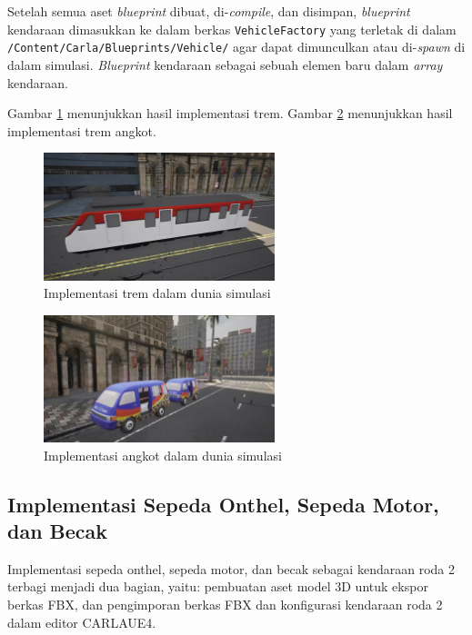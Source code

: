 Setelah semua aset \textit{blueprint} dibuat, di-\textit{compile}, dan disimpan,
\textit{blueprint} kendaraan dimasukkan ke dalam berkas \verb|VehicleFactory|
yang terletak di dalam \verb|/Content/Carla/Blueprints/Vehicle/| agar dapat
dimunculkan atau di-\textit{spawn} di dalam simulasi. \textit{Blueprint}
kendaraan sebagai sebuah elemen baru dalam \textit{array} kendaraan.

Gambar \ref{fig:tram-carla} menunjukkan hasil implementasi trem. Gambar
\ref{fig:angkot-carla} menunjukkan hasil implementasi trem  angkot.

\begin{figure}[!h]
    \centering
    \includegraphics[width=0.6\textwidth]{resources/chapter-4/tram-carla.png}
    \caption{Implementasi trem dalam dunia simulasi}
    \label{fig:tram-carla}
\end{figure}

\begin{figure}[!h]
    \centering
    \includegraphics[width=0.6\textwidth]{resources/chapter-4/angkot.png}
    \caption{Implementasi angkot dalam dunia simulasi}
    \label{fig:angkot-carla}
\end{figure}

\subsection{Implementasi Sepeda Onthel, Sepeda Motor, dan Becak}

Implementasi sepeda onthel, sepeda motor, dan becak sebagai kendaraan roda 2
terbagi menjadi dua bagian, yaitu: pembuatan aset model 3D untuk ekspor berkas
FBX, dan pengimporan berkas FBX dan konfigurasi kendaraan roda 2 dalam editor
CARLAUE4.

